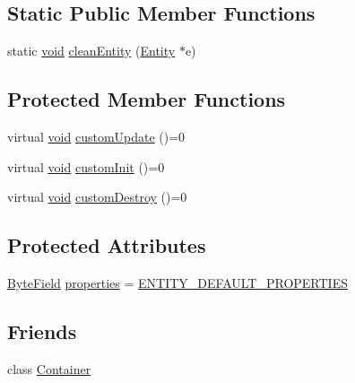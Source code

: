 \subsection*{Static Public Member Functions}
\begin{DoxyCompactItemize}
\item 
static \hyperlink{_s_d_l__opengles2__gl2ext_8h_ae5d8fa23ad07c48bb609509eae494c95}{void} \hyperlink{classmc_1_1_entity_a1db8a8b8c969deedaf12f8892531d8d0}{clean\+Entity} (\hyperlink{classmc_1_1_entity}{Entity} $\ast$e)
\end{DoxyCompactItemize}
\subsection*{Protected Member Functions}
\begin{DoxyCompactItemize}
\item 
virtual \hyperlink{_s_d_l__opengles2__gl2ext_8h_ae5d8fa23ad07c48bb609509eae494c95}{void} \hyperlink{classmc_1_1_entity_af10b82880e3740b7cbb5ed80bb9f6004}{custom\+Update} ()=0
\item 
virtual \hyperlink{_s_d_l__opengles2__gl2ext_8h_ae5d8fa23ad07c48bb609509eae494c95}{void} \hyperlink{classmc_1_1_entity_a6f8fcf75f3b584fc47523110a1c74f39}{custom\+Init} ()=0
\item 
virtual \hyperlink{_s_d_l__opengles2__gl2ext_8h_ae5d8fa23ad07c48bb609509eae494c95}{void} \hyperlink{classmc_1_1_entity_a2f639d91d2f9e933f4769841ad348ddd}{custom\+Destroy} ()=0
\end{DoxyCompactItemize}
\subsection*{Protected Attributes}
\begin{DoxyCompactItemize}
\item 
\hyperlink{namespacemc_a4ed352b00f84d2c3e9843cf5ea375ca0}{Byte\+Field} \hyperlink{classmc_1_1_entity_a4b96da9b66787566c63044472d690da1}{properties} = \hyperlink{namespacemc_aad93bda8c11c45721d4d2feb348f9d5f}{E\+N\+T\+I\+T\+Y\+\_\+\+D\+E\+F\+A\+U\+L\+T\+\_\+\+P\+R\+O\+P\+E\+R\+T\+I\+ES}
\end{DoxyCompactItemize}
\subsection*{Friends}
\begin{DoxyCompactItemize}
\item 
class \hyperlink{classmc_1_1_entity_aee29d97f7e87f0263024133085c28e3d}{Container}
\end{DoxyCompactItemize}


